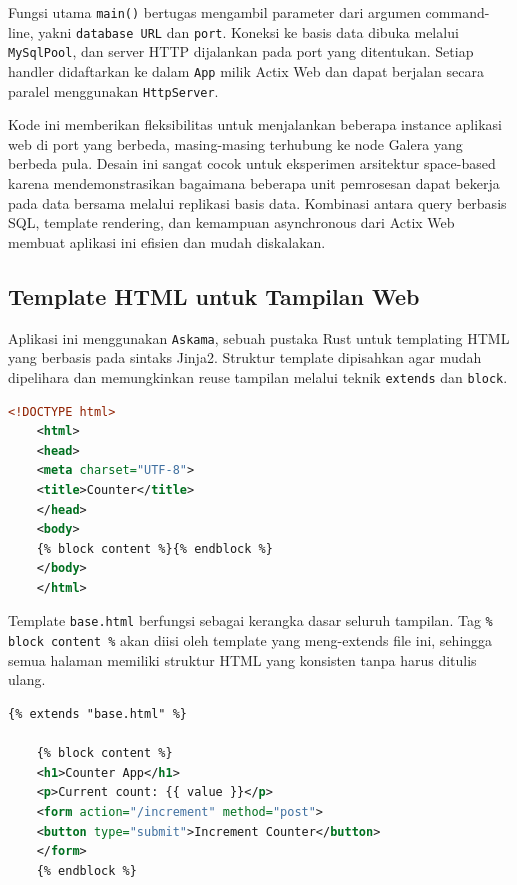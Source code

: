 Fungsi utama \texttt{main()} bertugas mengambil parameter dari argumen command-line, yakni \texttt{database URL} dan \texttt{port}. Koneksi ke basis data dibuka melalui \texttt{MySqlPool}, dan server HTTP dijalankan pada port yang ditentukan. Setiap handler didaftarkan ke dalam \texttt{App} milik Actix Web dan dapat berjalan secara paralel menggunakan \texttt{HttpServer}.

Kode ini memberikan fleksibilitas untuk menjalankan beberapa instance aplikasi web di port yang berbeda, masing-masing terhubung ke node Galera yang berbeda pula. Desain ini sangat cocok untuk eksperimen arsitektur space-based karena mendemonstrasikan bagaimana beberapa unit pemrosesan dapat bekerja pada data bersama melalui replikasi basis data. Kombinasi antara query berbasis SQL, template rendering, dan kemampuan asynchronous dari Actix Web membuat aplikasi ini efisien dan mudah diskalakan.

\subsection{Template HTML untuk Tampilan Web}

Aplikasi ini menggunakan \texttt{Askama}, sebuah pustaka Rust untuk templating HTML yang berbasis pada sintaks Jinja2. Struktur template dipisahkan agar mudah dipelihara dan memungkinkan reuse tampilan melalui teknik \texttt{extends} dan \texttt{block}.

\begin{lstlisting}[language=xml, caption={templates/base.html}]
	<!DOCTYPE html>
	<html>
	<head>
	<meta charset="UTF-8">
	<title>Counter</title>
	</head>
	<body>
	{% block content %}{% endblock %}
	</body>
	</html>
\end{lstlisting}

Template \texttt{base.html} berfungsi sebagai kerangka dasar seluruh tampilan. Tag \texttt{{\% block content \%}} akan diisi oleh template yang meng-extends file ini, sehingga semua halaman memiliki struktur HTML yang konsisten tanpa harus ditulis ulang.

\begin{lstlisting}[language=xml, caption={templates/index.html}]
	{% extends "base.html" %}
	
	{% block content %}
	<h1>Counter App</h1>
	<p>Current count: {{ value }}</p>
	<form action="/increment" method="post">
	<button type="submit">Increment Counter</button>
	</form>
	{% endblock %}
\end{lstlisting}

